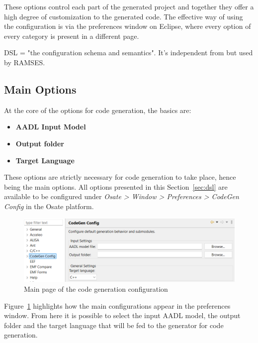 These options control each part of the generated project and together they offer a high degree of customization to the generated code. The effective way of using the configuration is via the preferences window on Eclipse, where every option of every category is present in a different page.


\begin{tcolorbox}[colback=green!5, colframe=green!40!black] DSL = "the configuration schema and semantics".  
It's independent from but used by \gls{RAMSES}. \end{tcolorbox}


\subsection{Main Options}
\label{sec:dsl_main}

At the core of the options for code generation, the basics are:

\begin{itemize}  
	\item \textbf{AADL Input Model}
	\item \textbf{Output folder}
	\item \textbf{Target Language}
\end{itemize}

These options are strictly necessary for code generation to take place, hence being the main options. All options presented in this Section~\ref{sec:dsl} are available to be configured under \textit{Osate > Window > Preferences > CodeGen Config} in the Osate platform.

\begin{figure}[htbp]
	\centering
	\includegraphics[width=\textwidth]{eclipse_config_main.png}
	\caption{Main page of the code generation configuration}
	\label{fig:eclipse_config_main}
\end{figure}

Figure~\ref{fig:eclipse_config_main} highlights how the main configurations appear in the preferences window. From here it is possible to select the input \gls{AADL} model, the output folder and the target language that will be fed to the generator for code generation.

